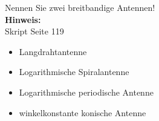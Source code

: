 \begin{question}[section=11,name={Breitbandantennen},difficulty=,quantity=1,type=thr,tags={20130625}]
	Nennen Sie zwei breitbandige Antennen!
	\\ \textbf{Hinweis:}\\
	Skript Seite 119
\end{question}
\begin{solution}
	\begin{itemize}
		\item{Langdrahtantenne}
		\item{Logarithmische Spiralantenne}
		\item{Logarithmische periodische Antenne}
		\item{winkelkonstante konische Antenne}
	\end{itemize}
\end{solution}